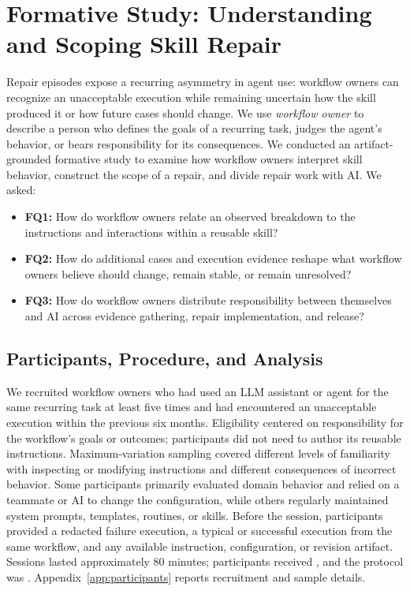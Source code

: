 \section{Formative Study: Understanding and Scoping Skill Repair}
\label{sec:formative}

Repair episodes expose a recurring asymmetry in agent use: workflow owners can
recognize an unacceptable execution while remaining uncertain how the skill
produced it or how future cases should change. We use \emph{workflow owner} to
describe a person who defines the goals of a recurring task, judges the agent's
behavior, or bears responsibility for its consequences. We conducted an
artifact-grounded formative study to examine how workflow owners interpret
skill behavior, construct the scope of a repair, and divide repair work with
AI. We asked:

\begin{itemize}[leftmargin=*,itemsep=2pt,topsep=3pt]
    \item \textbf{FQ1:} How do workflow owners relate an observed breakdown to
    the instructions and interactions within a reusable skill?

    \item \textbf{FQ2:} How do additional cases and execution evidence reshape
    what workflow owners believe should change, remain stable, or remain
    unresolved?

    \item \textbf{FQ3:} How do workflow owners distribute responsibility
    between themselves and AI across evidence gathering, repair
    implementation, and release?
\end{itemize}

\subsection{Participants, Procedure, and Analysis}
\label{sec:formative-method}

We recruited \StudyN{} workflow owners who had used an LLM assistant or agent
for the same recurring task at least five times and had encountered an
unacceptable execution within the previous six months. Eligibility centered on
responsibility for the workflow's goals or outcomes; participants did not need
to author its reusable instructions. Maximum-variation sampling covered
different levels of familiarity with inspecting or modifying instructions and
different consequences of incorrect behavior. Some participants primarily
evaluated domain behavior and relied on a teammate or AI to change the
configuration, while others regularly maintained system prompts, templates,
routines, or skills. Before the session, participants provided a redacted
failure execution, a typical or successful execution from the same workflow,
and any available instruction, configuration, or revision artifact. Sessions
lasted approximately 80 minutes; participants received \StudyCompensation{},
and the protocol was \StudyEthics{}. Appendix~\ref{app:participants} reports
recruitment and sample details.

